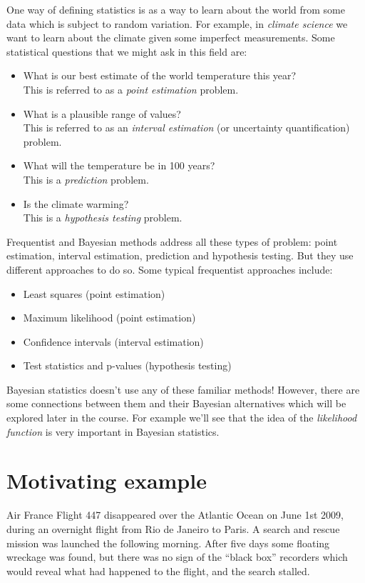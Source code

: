One way of defining statistics is as a way to learn about the world from some data which is subject to random variation.
For example, in \emph{climate science} we want to learn about the climate given some imperfect measurements.
Some statistical questions that we might ask in this field are:
\begin{itemize}
\item What is our best estimate of the world temperature this year?\\
This is referred to as a \emph{point estimation} problem.
\item What is a plausible range of values?\\
This is referred to as an \emph{interval estimation} (or uncertainty quantification) problem.
\item What will the temperature be in 100 years?\\
This is a \emph{prediction} problem.
\item Is the climate warming?\\
This is a \emph{hypothesis testing} problem.
\end{itemize}

Frequentist and Bayesian methods address all these types of problem: point estimation, interval estimation, prediction and hypothesis testing.
But they use different approaches to do so.
Some typical frequentist approaches include:
\begin{itemize}
\item Least squares (point estimation)
\item Maximum likelihood (point estimation)
\item Confidence intervals (interval estimation)
\item Test statistics and p-values (hypothesis testing)
\end{itemize}
Bayesian statistics doesn't use any of these familiar methods!
However, there are some connections between them and their Bayesian alternatives which will be explored later in the course.
For example we'll see that the idea of the \emph{likelihood function} is very important in Bayesian statistics.

\section*{Motivating example}

Air France Flight 447 disappeared over the Atlantic Ocean on June 1st 2009,
during an overnight flight from Rio de Janeiro to Paris.
A search and rescue mission was launched the following morning.
After five days some floating wreckage was found, but there was no sign of the ``black box'' recorders which would reveal what had happened to the flight, and the search stalled.

